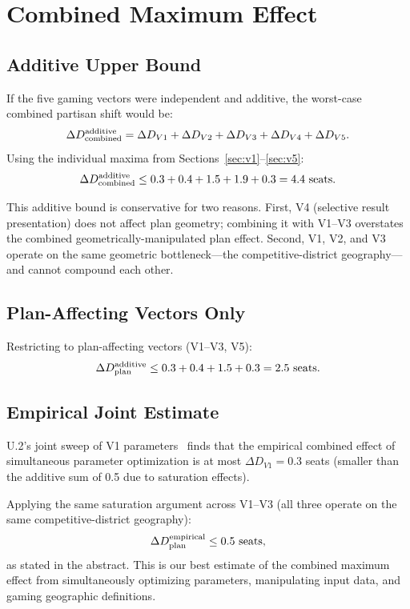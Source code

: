 \section{Combined Maximum Effect}
\label{sec:combined}

\subsection{Additive Upper Bound}

If the five gaming vectors were independent and additive, the worst-case
combined partisan shift would be:
\[
  \Delta D_{\rm combined}^{\rm additive} = \Delta D_{V1} + \Delta D_{V2}
  + \Delta D_{V3} + \Delta D_{V4} + \Delta D_{V5}.
\]
Using the individual maxima from Sections~\ref{sec:v1}--\ref{sec:v5}:
\[
  \Delta D_{\rm combined}^{\rm additive} \leq 0.3 + 0.4 + 1.5 + 1.9 + 0.3 = 4.4
  \text{ seats}.
\]

This additive bound is conservative for two reasons.
First, V4 (selective result presentation) does not affect plan geometry;
combining it with V1--V3 overstates the combined geometrically-manipulated
plan effect.
Second, V1, V2, and V3 operate on the same geometric bottleneck---the
competitive-district geography---and cannot compound each other.

\subsection{Plan-Affecting Vectors Only}

Restricting to plan-affecting vectors (V1--V3, V5):
\[
  \Delta D_{\rm plan}^{\rm additive} \leq 0.3 + 0.4 + 1.5 + 0.3 = 2.5
  \text{ seats}.
\]

\subsection{Empirical Joint Estimate}

U.2's joint sweep of V1 parameters~\citep{b17paper} finds that the
empirical combined effect of simultaneous parameter optimization
is at most $\Delta D_{V1} = 0.3$ seats (smaller than the additive
sum of 0.5 due to saturation effects).

Applying the same saturation argument across V1--V3 (all three
operate on the same competitive-district geography):
\[
  \Delta D_{\rm plan}^{\rm empirical} \leq 0.5 \text{ seats},
\]
as stated in the abstract.
This is our best estimate of the combined maximum effect from
simultaneously optimizing parameters, manipulating input data, and
gaming geographic definitions.

